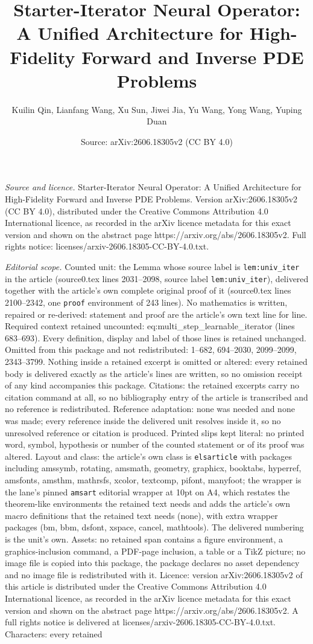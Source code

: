 \documentclass[10pt,a4paper]{amsart}
\title[Starter-Iterator Neural Operator: A Unified Architecture for]{Starter-Iterator Neural Operator: A Unified Architecture for High-Fidelity Forward and Inverse PDE Problems}
\author{Kuilin Qin, Lianfang Wang, Xu Sun, Jiwei Jia, Yu Wang, Yong Wang, Yuping Duan}
\date{Source: arXiv:2606.18305v2 (CC BY 4.0)}
\begin{document}
\maketitle

\noindent\emph{Source and licence.} Starter-Iterator Neural Operator: A Unified Architecture for High-Fidelity Forward and Inverse PDE Problems. Version arXiv:2606.18305v2 (CC BY 4.0), distributed under the Creative Commons Attribution 4.0 International licence, as recorded in the arXiv licence metadata for this exact version and shown on the abstract page https://arxiv.org/abs/2606.18305v2. Full rights notice: licenses/arxiv-2606.18305-CC-BY-4.0.txt.\par\smallskip

\noindent\textit{Editorial scope.} Counted unit: the Lemma whose source label is \texttt{lem:univ\_iter} in the article (source0.tex lines 2031--2098, source label \texttt{lem:univ\_iter}), delivered together with the article's own complete original proof of it (source0.tex lines 2100--2342, one \texttt{proof} environment of 243 lines). No mathematics is written, repaired or re-derived: statement and proof are the article's own text line for line. Required context retained uncounted: eq:multi\_step\_learnable\_iterator (lines 683--693). Every definition, display and label of those lines is retained unchanged. Omitted from this package and not redistributed: 1--682, 694--2030, 2099--2099, 2343--3799. Nothing inside a retained excerpt is omitted or altered: every retained body is delivered exactly as the article's lines are written, so no omission receipt of any kind accompanies this package. Citations: the retained excerpts carry no citation command at all, so no bibliography entry of the article is transcribed and no reference is redistributed. Reference adaptation: none was needed and none was made; every reference inside the delivered unit resolves inside it, so no unresolved reference or citation is produced. Printed slips kept literal: no printed word, symbol, hypothesis or number of the counted statement or of its proof was altered. Layout and class: the article's own class is \texttt{elsarticle} with packages including amssymb, rotating, amsmath, geometry, graphicx, booktabs, hyperref, amsfonts, amsthm, mathrsfs, xcolor, textcomp, pifont, manyfoot; the wrapper is the lane's pinned \texttt{amsart} editorial wrapper at 10pt on A4, which restates the theorem-like environments the retained text needs and adds the article's own macro definitions that the retained text needs (none), with extra wrapper packages (bm, bbm, dsfont, xspace, cancel, mathtools). The delivered numbering is the unit's own. Assets: no retained span contains a figure environment, a graphics-inclusion command, a PDF-page inclusion, a table or a TikZ picture; no image file is copied into this package, the package declares no asset dependency and no image file is redistributed with it. Licence: version arXiv:2606.18305v2 of this article is distributed under the Creative Commons Attribution 4.0 International licence, as recorded in the arXiv licence metadata for this exact version and shown on the abstract page https://arxiv.org/abs/2606.18305v2. A full rights notice is delivered at licenses/arxiv-2606.18305-CC-BY-4.0.txt. Characters: every retained 
\end{document}
